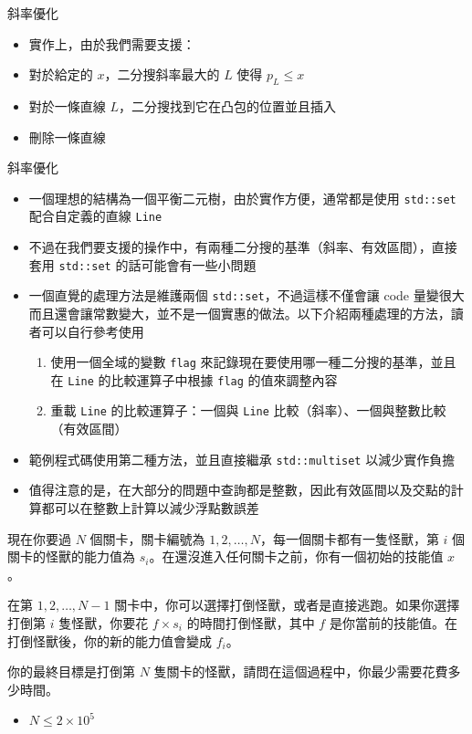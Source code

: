 \documentclass[standalone]{beamer}
\begin{document}
\begin{frame}{斜率優化}
  \begin{itemize}
    \item 實作上，由於我們需要支援：
    \item 對於給定的 $x$，二分搜斜率最大的 $L$ 使得 $p_L \leq x$
    \item 對於一條直線 $L$，二分搜找到它在凸包的位置並且插入
    \item 刪除一條直線
  \end{itemize}
\end{frame}

\begin{frame}{斜率優化}
  \begin{itemize}
    \item 一個理想的結構為一個平衡二元樹，由於實作方便，通常都是使用 \texttt{std::set} 配合自定義的直線 \texttt{Line}
    \item 不過在我們要支援的操作中，有兩種二分搜的基準（斜率、有效區間），直接套用 \texttt{std::set} 的話可能會有一些小問題
    \item 一個直覺的處理方法是維護兩個 \texttt{std::set}，不過這樣不僅會讓 code 量變很大而且還會讓常數變大，並不是一個實惠的做法。以下介紹兩種處理的方法，讀者可以自行參考使用
    \begin{enumerate}
      \item 使用一個全域的變數 \texttt{flag} 來記錄現在要使用哪一種二分搜的基準，並且在 \texttt{Line} 的比較運算子中根據 \texttt{flag} 的值來調整內容
      \item 重載 \texttt{Line} 的比較運算子：一個與 \texttt{Line} 比較（斜率）、一個與整數比較（有效區間）
    \end{enumerate}
    \item 範例程式碼使用第二種方法，並且直接繼承 \texttt{std::multiset} 以減少實作負擔
    \item 值得注意的是，在大部分的問題中查詢都是整數，因此有效區間以及交點的計算都可以在整數上計算以減少浮點數誤差
  \end{itemize}
\end{frame}

\begin{frame}{}
  \begin{problem}
    現在你要過 $N$ 個關卡，關卡編號為 $1, 2, \dots, N$，每一個關卡都有一隻怪獸，第 $i$ 個關卡的怪獸的能力值為 $s_i$。在還沒進入任何關卡之前，你有一個初始的技能值 $x$。

    在第 $1, 2, \dots, N - 1$ 關卡中，你可以選擇打倒怪獸，或者是直接逃跑。如果你選擇打倒第 $i$ 隻怪獸，你要花 $f \times s_i$ 的時間打倒怪獸，其中 $f$ 是你當前的技能值。在打倒怪獸後，你的新的能力值會變成 $f_i$。

    你的最終目標是打倒第 $N$ 隻關卡的怪獸，請問在這個過程中，你最少需要花費多少時間。

    \begin{itemize}
      \item $N \leq 2 \times 10^5$
    \end{itemize}
  \end{problem}
\end{frame}
\end{document}
